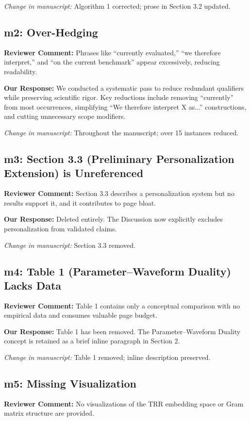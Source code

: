 \documentclass[11pt]{article}
\newcommand{\reviewer}[1]{\textcolor{reviewercolor}{\textbf{Reviewer Comment:} #1}}
\newcommand{\response}[1]{\textcolor{responsecolor}{\textbf{Our Response:} #1}}
\newcommand{\change}[1]{\textit{Change in manuscript:} #1}
\begin{document}
\change{Algorithm 1 corrected; prose in Section 3.2 updated.}

\subsection*{m2: Over-Hedging}

\reviewer{Phrases like ``currently evaluated,'' ``we therefore interpret,'' and ``on the current benchmark'' appear excessively, reducing readability.}

\response{We conducted a systematic pass to reduce redundant qualifiers while preserving scientific rigor. Key reductions include removing ``currently'' from most occurrences, simplifying ``We therefore interpret X as...'' constructions, and cutting unnecessary scope modifiers.}

\change{Throughout the manuscript; over 15 instances reduced.}

\subsection*{m3: Section 3.3 (Preliminary Personalization Extension) is Unreferenced}

\reviewer{Section 3.3 describes a personalization system but no results support it, and it contributes to page bloat.}

\response{Deleted entirely. The Discussion now explicitly excludes personalization from validated claims.}

\change{Section 3.3 removed.}

\subsection*{m4: Table 1 (Parameter--Waveform Duality) Lacks Data}

\reviewer{Table 1 contains only a conceptual comparison with no empirical data and consumes valuable page budget.}

\response{Table 1 has been removed. The Parameter--Waveform Duality concept is retained as a brief inline paragraph in Section 2.}

\change{Table 1 removed; inline description preserved.}

\subsection*{m5: Missing Visualization}

\reviewer{No visualizations of the TRR embedding space or Gram matrix structure are provided.}
\end{document}
